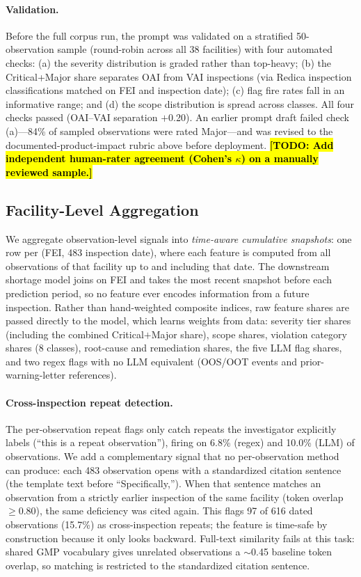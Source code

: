 \documentclass[12pt]{article}
\newcommand{\todo}[1]{\hl{\textbf{[TODO: #1]}}}
\begin{document}
\paragraph{Validation.}
Before the full corpus run, the prompt was validated on a stratified
50-observation sample (round-robin across all 38 facilities) with four
automated checks: (a) the severity distribution is graded rather than
top-heavy; (b) the Critical+Major share separates OAI from VAI inspections
(via Redica inspection classifications matched on FEI and inspection date);
(c) flag fire rates fall in an informative range; and (d) the scope
distribution is spread across classes.
All four checks passed (OAI--VAI separation $+$0.20).
An earlier prompt draft failed check (a)---84\% of sampled observations were
rated Major---and was revised to the documented-product-impact rubric above
before deployment.
\todo{Add independent human-rater agreement (Cohen's $\kappa$) on a
manually reviewed sample.}

\subsection{Facility-Level Aggregation}

We aggregate observation-level signals into \emph{time-aware cumulative
snapshots}: one row per (FEI, 483 inspection date), where each feature is
computed from all observations of that facility up to and including that
date.
The downstream shortage model joins on FEI and takes the most recent snapshot
before each prediction period, so no feature ever encodes information from a
future inspection.
Rather than hand-weighted composite indices, raw feature shares are passed
directly to the model, which learns weights from data: severity tier shares
(including the combined Critical$+$Major share), scope shares, violation
category shares (8 classes), root-cause and remediation shares, the five LLM
flag shares, and two regex flags with no LLM equivalent (OOS/OOT events and
prior-warning-letter references).

\paragraph{Cross-inspection repeat detection.}
The per-observation repeat flags only catch repeats the investigator
explicitly labels (``this is a repeat observation''), firing on 6.8\%
(regex) and 10.0\% (LLM) of observations.
We add a complementary signal that no per-observation method can produce:
each 483 observation opens with a standardized citation sentence (the
template text before ``Specifically,'').
When that sentence matches an observation from a strictly earlier inspection
of the same facility (token overlap $\geq 0.80$), the same deficiency was
cited again.
This flags 97 of 616 dated observations (15.7\%) as cross-inspection
repeats; the feature is time-safe by construction because it only looks
backward.
Full-text similarity fails at this task: shared GMP vocabulary gives
unrelated observations a $\sim$0.45 baseline token overlap, so matching is
restricted to the standardized citation sentence.
\end{document}
